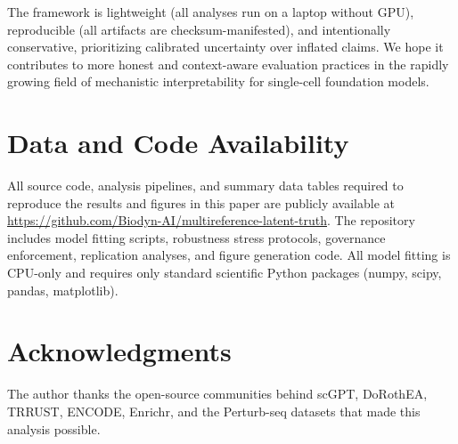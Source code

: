 \documentclass[11pt,a4paper]{article}
\begin{document}
The framework is lightweight (all analyses run on a laptop without GPU), reproducible (all artifacts are checksum-manifested), and intentionally conservative, prioritizing calibrated uncertainty over inflated claims.
We hope it contributes to more honest and context-aware evaluation practices in the rapidly growing field of mechanistic interpretability for single-cell foundation models.

\section*{Data and Code Availability}

All source code, analysis pipelines, and summary data tables required to reproduce the results and figures in this paper are publicly available at \url{https://github.com/Biodyn-AI/multireference-latent-truth}.
The repository includes model fitting scripts, robustness stress protocols, governance enforcement, replication analyses, and figure generation code.
All model fitting is CPU-only and requires only standard scientific Python packages (numpy, scipy, pandas, matplotlib).

\section*{Acknowledgments}

The author thanks the open-source communities behind scGPT, DoRothEA, TRRUST, ENCODE, Enrichr, and the Perturb-seq datasets that made this analysis possible.
\end{document}
